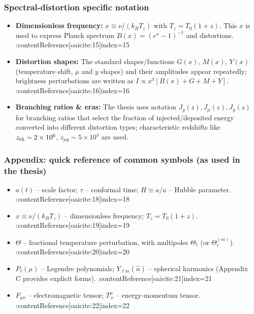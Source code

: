 \subsubsection{Spectral-distortion specific notation}
\begin{itemize}
  \item \textbf{Dimensionless frequency:} $x\equiv \nu/(k_B T_z)$ with $T_z=T_0(1+z)$. This $x$ is used to express Planck spectrum $B(x)=(e^x-1)^{-1}$ and distortions. :contentReference[oaicite:15]{index=15}
  \item \textbf{Distortion shapes:} The standard shapes/functions $G(x),\,M(x),\,Y(x)$ (temperature shift, $\mu$ and $y$ shapes) and their amplitudes appear repeatedly; brightness perturbations are written as $I\propto x^3[B(x)+G+M+Y]$. :contentReference[oaicite:16]{index=16}
  \item \textbf{Branching ratios \& eras:} The thesis uses notation $J_g(z),J_\mu(z),J_y(z)$ for branching ratios that select the fraction of injected/deposited energy converted into different distortion types; characteristic redshifts like $z_{\rm th}\sim 2\times10^6$, $z_{\mu y}\sim 5\times10^4$ are used. 
\end{itemize}

\subsubsection*{Appendix: quick reference of common symbols (as used in the thesis)}
\begin{itemize}
  \item $a(t)$ -- scale factor; $\tau$ -- conformal time; $H\equiv\dot a/a$ -- Hubble parameter. :contentReference[oaicite:18]{index=18}
  \item $x\equiv \nu/(k_B T_z)$ -- dimensionless frequency; $T_z=T_0(1+z)$. :contentReference[oaicite:19]{index=19}
  \item $\Theta$ -- fractional temperature perturbation, with multipoles $\Theta_\ell$ (or $\Theta_\ell^{(m)}$). :contentReference[oaicite:20]{index=20}
  \item $P_\ell(\mu)$ -- Legendre polynomials; $Y_{\ell m}(\hat n)$ -- spherical harmonics (Appendix C provides explicit forms). :contentReference[oaicite:21]{index=21}
  \item $F_{\mu\nu}$ -- electromagnetic tensor; $T^\mu_{\ \nu}$ -- energy-momentum tensor. :contentReference[oaicite:22]{index=22}
\end{itemize}
